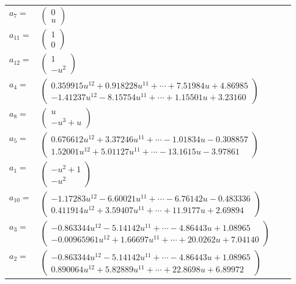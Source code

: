 \documentclass[1p]{elsarticle_modified}
\theoremstyle{definition}
\begin{document}
\begin{tabular}{m{7pt} m{180pt} m{7pt} m{180pt} }
\flushright $a_{7}=$&$\begin{pmatrix}0\\u\end{pmatrix}$ \\
\flushright $a_{11}=$&$\begin{pmatrix}1\\0\end{pmatrix}$ \\
\flushright $a_{12}=$&$\begin{pmatrix}1\\- u^2\end{pmatrix}$ \\
\flushright $a_{4}=$&$\begin{pmatrix}0.359915 u^{12}+0.918228 u^{11}+\cdots+7.51984 u+4.86985\\-1.41237 u^{12}-8.15754 u^{11}+\cdots+1.15501 u+3.23160\end{pmatrix}$ \\
\flushright $a_{8}=$&$\begin{pmatrix}u\\- u^3+u\end{pmatrix}$ \\
\flushright $a_{5}=$&$\begin{pmatrix}0.676612 u^{12}+3.37246 u^{11}+\cdots-1.01834 u-0.308857\\1.52001 u^{12}+5.01127 u^{11}+\cdots-13.1615 u-3.97861\end{pmatrix}$ \\
\flushright $a_{1}=$&$\begin{pmatrix}- u^2+1\\- u^2\end{pmatrix}$ \\
\flushright $a_{10}=$&$\begin{pmatrix}-1.17283 u^{12}-6.60021 u^{11}+\cdots-6.76142 u-0.483336\\0.411914 u^{12}+3.59407 u^{11}+\cdots+11.9177 u+2.69894\end{pmatrix}$ \\
\flushright $a_{3}=$&$\begin{pmatrix}-0.863344 u^{12}-5.14142 u^{11}+\cdots-4.86443 u+1.08965\\-0.00965961 u^{12}+1.66697 u^{11}+\cdots+20.0262 u+7.04140\end{pmatrix}$ \\
\flushright $a_{2}=$&$\begin{pmatrix}-0.863344 u^{12}-5.14142 u^{11}+\cdots-4.86443 u+1.08965\\0.890064 u^{12}+5.82889 u^{11}+\cdots+22.8698 u+6.89972\end{pmatrix}$ \\

\end{tabular}
\end{document}
